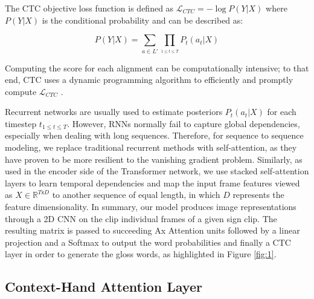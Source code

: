 \documentclass[a4paper,conference]{IEEEtran}
\begin{document}
The CTC objective loss function is defined as $\mathcal{L}_{CTC} = -\log  P(Y|X)$ where $P(Y|X)$ is the conditional probability and can be described as:

\begin{equation}
P(Y|X) = \sum_{a\in L'} \prod_{_{1\leq t\leq T}}
P_t(a_t|X)
\label{eq:2}
\end{equation}

Computing the score for each alignment can be computationally intensive; to that end, CTC uses a dynamic programming algorithm to efficiently and promptly compute $\mathcal{L}_{CTC}$ \cite{hannun2017sequence}. 

Recurrent networks are usually used to estimate posteriors $P_t(a_t|X)$ for each timestep $t_{1\leq t\leq T}$. However, RNNs normally fail to capture global dependencies, especially when dealing with long sequences. Therefore, for sequence to sequence modeling, we replace traditional recurrent methods with self-attention, as they have proven to be more resilient to the vanishing gradient problem. Similarly, as used in the encoder side of the Transformer network, we use stacked self-attention layers to learn temporal dependencies and map the input frame features viewed as  $X \in \mathbb{R}^{T\mathsf{x}D}$ 
to another sequence of equal length, in which $D$ represents the feature dimensionality. In summary, our model produces image representations through a 2D CNN on the clip individual frames of a given sign clip. The resulting matrix is passed to succeeding Ax Attention units followed by a linear projection and a Softmax to output the word probabilities and finally a CTC layer in order to generate the gloss words, as highlighted in Figure \ref{fig:1}.


\subsection{Context-Hand Attention Layer}
\end{document}
